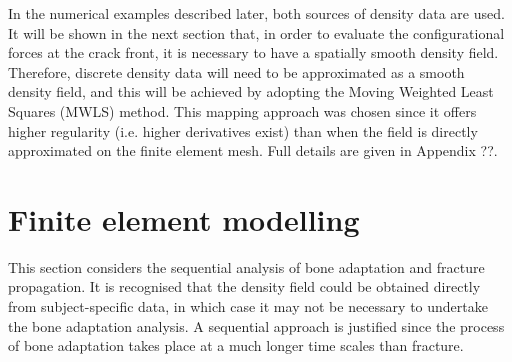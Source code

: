 \documentclass[review]{elsarticle}
\numberwithin{equation}{section}
\begin{document}
In the numerical examples described later, both sources of density data are used. It will be shown in the next section that, in order to evaluate the configurational forces at the crack front, it is necessary to have a spatially smooth density field. Therefore, discrete density data will need to be approximated as a smooth density field, and this will be achieved by adopting the Moving Weighted Least Squares (MWLS) method. This mapping approach was chosen since it offers higher regularity (i.e. higher derivatives exist) than when the field is
directly approximated on the finite element mesh. Full details are given in Appendix ??. 









\section{Finite element modelling} \label{sec:fem_modelling}

This section considers the sequential analysis of bone adaptation and fracture propagation. It is recognised that the density field could be obtained directly from subject-specific data, in which case it may not be necessary to undertake the bone adaptation analysis. A sequential approach is justified since the process of bone adaptation takes place at a much longer time scales than fracture.
\end{document}

